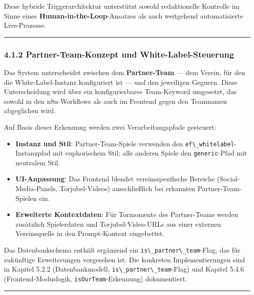 Diese hybride Triggerarchitektur unterstützt sowohl redaktionelle
Kontrolle im Sinne eines \textbf{Human-in-the-Loop}-Ansatzes als auch
weitgehend automatisierte Live-Prozesse.

\begin{center}\rule{0.5\linewidth}{0.5pt}\end{center}

\subsubsection{4.1.2 Partner-Team-Konzept und
White-Label-Steuerung}\label{partner-team-konzept-und-white-label-steuerung}

Das System unterscheidet zwischen dem \textbf{Partner-Team} --- dem
Verein, für den die White-Label-Instanz konfiguriert ist --- und den
jeweiligen Gegnern. Diese Unterscheidung wird über ein konfigurierbares
Team-Keyword umgesetzt, das sowohl in den n8n-Workflows als auch im
Frontend gegen den Teamnamen abgeglichen wird.

Auf Basis dieser Erkennung werden zwei Verarbeitungspfade gesteuert:

\begin{itemize}
\tightlist
\item
  \textbf{Instanz und Stil}: Partner-Team-Spiele verwenden den
  \passthrough{\lstinline!ef\_whitelabel!}-Instanzpfad mit euphorischem
  Stil; alle anderen Spiele den \passthrough{\lstinline!generic!}-Pfad
  mit neutralem Stil.
\item
  \textbf{UI-Anpassung}: Das Frontend blendet vereinsspezifische
  Bereiche (Social-Media-Panels, Torjubel-Videos) ausschließlich bei
  erkannten Partner-Team-Spielen ein.
\item
  \textbf{Erweiterte Kontextdaten}: Für Tormomente des Partner-Teams
  werden zusätzlich Spielerdaten und Torjubel-Video-URLs aus einer
  externen Vereinsquelle in den Prompt-Kontext eingebettet.
\end{itemize}

Das Datenbankschema enthält ergänzend ein
\passthrough{\lstinline!is\_partner\_team!}-Flag, das für zukünftige
Erweiterungen vorgesehen ist. Die konkreten Implementierungen sind in
Kapitel 5.2.2 (Datenbankmodell,
\passthrough{\lstinline!is\_partner\_team!}-Flag) und Kapitel 5.4.6
(Frontend-Moduslogik, \passthrough{\lstinline!isOurTeam!}-Erkennung)
dokumentiert.

\begin{center}\rule{0.5\linewidth}{0.5pt}\end{center}


